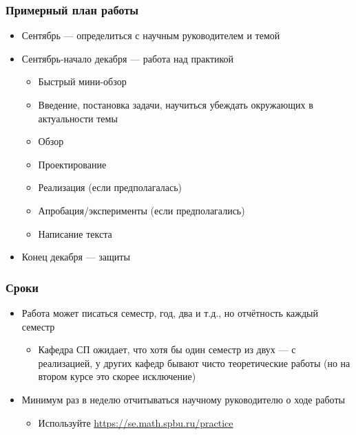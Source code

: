 \documentclass{../../slides-style}
\begin{document}
    \begin{frame}
        \frametitle{Примерный план работы}
        \begin{itemize}
            \item Сентябрь --- определиться с научным руководителем и темой
            \item Сентябрь-начало декабря --- работа над практикой
            \begin{itemize}
                \item Быстрый мини-обзор
                \item Введение, постановка задачи, научиться убеждать окружающих в актуальности темы
                \item Обзор
                \item Проектирование
                \item Реализация (если предполагалась)
                \item Апробация/эксперименты (если предполагались)
                \item Написание текста
            \end{itemize}
            \item Конец декабря --- защиты
        \end{itemize}
    \end{frame}

    \begin{frame}
        \frametitle{Сроки}
        \begin{itemize}
            \item Работа может писаться семестр, год, два и т.д., но отчётность каждый семестр
            \begin{itemize}
                \item Кафедра СП ожидает, что хотя бы один семестр из двух --- с реализацией, у других кафедр бывают чисто теоретические работы (но на втором курсе это скорее исключение)
            \end{itemize}
            \item Минимум раз в неделю отчитываться научному руководителю о ходе работы
            \begin{itemize}
                \item Используйте \url{https://se.math.spbu.ru/practice}
            \end{itemize}
        \end{itemize}
    \end{frame}
\end{document}

